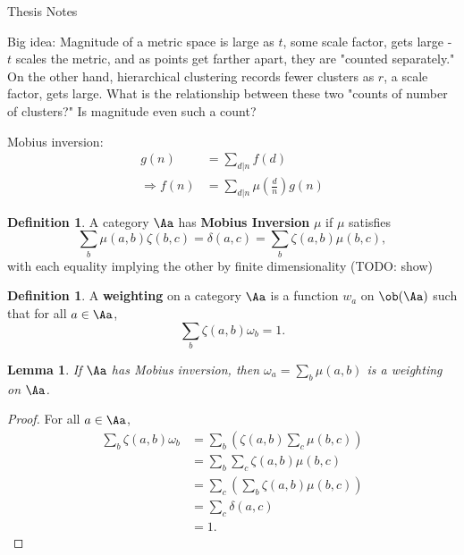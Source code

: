 \documentclass{article}
\newtheorem{sumMobiusWeighting}[cc]{Lemma}
\theoremstyle{definition}
\newtheorem{defCatMobius}[cc]{Definition}
\newtheorem{defWeighting}[cc]{Definition}
\begin{document}
\begin{center}{\Large Thesis Notes}\\ \vspace{1 ex} \end{center}


\vspace{2 ex}
\noindent

Big idea: Magnitude of a metric space is large as $t$, some scale factor, gets large - $t$ scales the metric, and as points get farther apart, they are "counted separately." On the other hand, hierarchical clustering records fewer clusters as $r$, a scale factor, gets large. What is the relationship between these two "counts of number of clusters?" Is magnitude even such a count?

Mobius inversion:
\begin{align*}
g(n) &= \sum_{d | n} f(d) \\
\Rightarrow f(n) &= \sum_{d | n} \mu(\frac dn) g(n)
\end{align*}

\begin{defCatMobius}
A category $\Aa$ has \textbf{Mobius Inversion} $\mu$ if $\mu$ satisfies
\[
\sum_b \mu(a,b)\zeta(b,c) = \delta(a,c) = \sum_b \zeta(a,b)\mu(b,c),
\]
with each equality implying the other by finite dimensionality (TODO: show)
\end{defCatMobius}
\begin{defWeighting}
A \textbf{weighting} on a category $\Aa$ is a function $w_a$ on $\ob(\Aa)$ such that for all $a \in \Aa$,
\[
\sum_b \zeta(a,b)\omega_b = 1.
\]
\end{defWeighting}
\begin{sumMobiusWeighting}
If $\Aa$ has Mobius inversion, then $\omega_a = \sum_b \mu(a,b)$ is a weighting on $\Aa$.
\end{sumMobiusWeighting}
\begin{proof} For all $a \in \Aa$,
\begin{align*}
\sum_b \zeta(a,b)\omega_b &= \sum_b\left( \zeta(a,b)\sum_c \mu(b,c)\right)\\
&=\sum_b\sum_c\zeta(a,b)\mu(b,c)\\
&=\sum_c\left(\sum_b\zeta(a,b)\mu(b,c)\right)\\
&=\sum_c \delta(a,c)\\
&=1.
\end{align*}
\end{proof}
\end{document}
